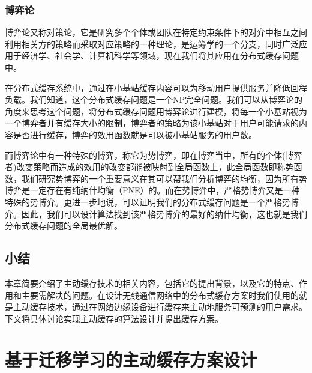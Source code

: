 \documentclass[bachelor]{seuthesis} %
\begin{document}
\begin{Main}
\subsection{博弈论}
博弈论又称对策论，它是研究多个个体或团队在特定约束条件下的对弈中相互之间利用相关方的策略而采取对应策略的一种理论，是运筹学的一个分支，同时广泛应用于经济学、社会学、计算机科学等领域，现在我们将其应用在分布式缓存问题中。\par
在分布式缓存系统中，通过在小基站缓存内容可以为移动用户提供服务并降低回程负载。我们知道，这个分布式缓存问题是一个NP完全问题。我们可以从博弈论的角度来思考这个问题，将分布式缓存问题用博弈论进行建模，将每一个小基站视为一个博弈者并有缓存大小的限制，博弈者的策略为该小基站对于用户可能请求的内容是否进行缓存，博弈的效用函数就是可以被小基站服务的用户数。\par
而博弈论中有一种特殊的博弈，称它为势博弈，即在博弈当中，所有的个体(博弈者)改变策略而造成的效用的改变都能被映射到全局函数上，此全局函数即称势函数，我们研究势博弈的一个重要意义在其可以帮我们分析博弈的均衡，因为所有势博弈是一定存在有纯纳什均衡（PNE）的。而在势博弈中，严格势博弈又是一种特殊的势博弈。更进一步地说，可以证明我们的分布式缓存问题是一个严格势博弈。因此，我们可以设计算法找到该严格势博弈的最好的纳什均衡，这也就是我们分布式缓存问题的全局最优解。
\section{小结}
本章简要介绍了主动缓存技术的相关内容，包括它的提出背景，以及它的特点、作用和主要需解决的问题。在设计无线通信网络中的分布式缓存方案时我们使用的就是主动缓存技术，通过在网络边缘设备进行缓存来主动地服务可预测的用户需求。下文将具体讨论实现主动缓存的算法设计并提出缓存方案。
\chapter{基于迁移学习的主动缓存方案设计}

\end{Main}
\end{document}

